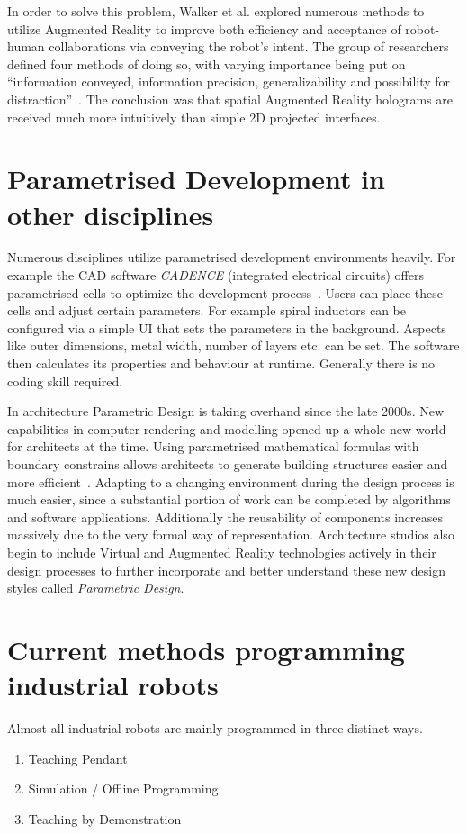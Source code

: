 In order to solve this problem, Walker et al. \cite{walker2018communicating} explored numerous methods to utilize Augmented Reality to improve both efficiency and acceptance of robot-human collaborations via conveying the robot's intent. The group of researchers defined four methods of doing so, with varying importance being put on “information conveyed, information precision, generalizability and possibility for distraction”~\cite{walker2018communicating}. The conclusion was that spatial Augmented Reality holograms are received much more intuitively than simple 2D projected interfaces.

\section{Parametrised Development in other disciplines}\label{Section:ParametricDesignIntoduction}
Numerous disciplines utilize parametrised development environments heavily. For example the CAD software \textit{CADENCE} (integrated electrical circuits) offers parametrised cells to optimize the development process~\cite{parametrizedCellElectricalInductor}. Users can place these cells and adjust certain parameters. For example spiral inductors can be configured via a simple UI that sets the parameters in the background. Aspects like outer dimensions, metal width, number of layers etc. can be set. The software then calculates its properties and behaviour at runtime. Generally there is no coding skill required.

In architecture Parametric Design is taking overhand since the late 2000s. New capabilities in computer rendering and modelling opened up a whole new world for architects at the time. Using parametrised mathematical formulas with boundary constrains allows architects to generate building structures easier and more efficient~\cite{stavric2011parametric}. Adapting to a changing environment during the design process is much easier, since a substantial portion of work can be completed by algorithms and software applications. Additionally the reusability of  components increases massively due to the very formal way of representation. Architecture studios also begin to include Virtual and Augmented Reality technologies actively in their design processes to further incorporate and better understand these new design styles called \textit{Parametric Design}. 


\section{Current methods programming industrial robots}
Almost all industrial robots are mainly programmed in three distinct ways.
\begin{enumerate}
	\setcounter{enumi}{0}
	\setlength\itemsep{-1em}
	\item Teaching Pendant
	\item Simulation / Offline Programming
	\item Teaching by Demonstration
\end{enumerate}

